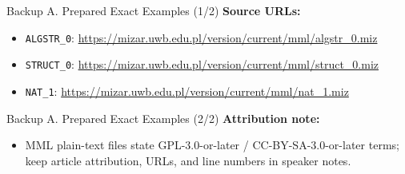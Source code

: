 \documentclass[aspectratio=169,11pt]{beamer}
\begin{document}
\begin{frame}[fragile,t]{Backup A. Prepared Exact Examples (1/2)}
\smallskip
\textbf{Source URLs:}
\begin{itemize}
\setlength{\itemsep}{1pt}
\setlength{\parsep}{0pt}
\setlength{\parskip}{0pt}
\item \texttt{ALGSTR\_0}: \url{https://mizar.uwb.edu.pl/version/current/mml/algstr\_0.miz}
\item \texttt{STRUCT\_0}: \url{https://mizar.uwb.edu.pl/version/current/mml/struct\_0.miz}
\item \texttt{NAT\_1}: \url{https://mizar.uwb.edu.pl/version/current/mml/nat\_1.miz}
\end{itemize}
\end{frame}

\begin{frame}[fragile,t]{Backup A. Prepared Exact Examples (2/2)}
\smallskip
\textbf{Attribution note:}
\begin{itemize}
\setlength{\itemsep}{1pt}
\setlength{\parsep}{0pt}
\setlength{\parskip}{0pt}
\item MML plain-text files state GPL-3.0-or-later / CC-BY-SA-3.0-or-later terms; keep article attribution, URLs, and line numbers in speaker notes.
\end{itemize}
\end{frame}
\end{document}
